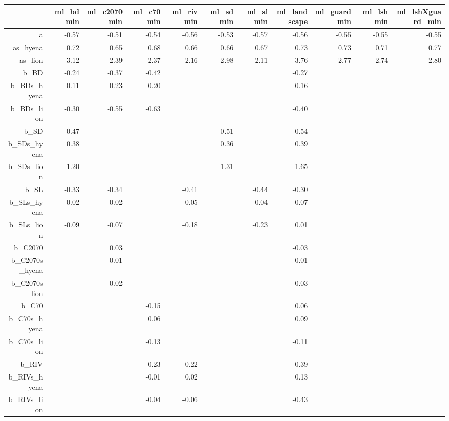 \begin{table}[ht]
\centering
\begin{tabular}{rrrrrrrrrrr}
  \hline
 & ml\_bd\_min & ml\_c2070\_min & ml\_c70\_min & ml\_riv\_min & ml\_sd\_min & ml\_sl\_min & ml\_landscape & ml\_guard\_min & ml\_lsh\_min & ml\_lshXguard\_min \\ 
  \hline
a & -0.57 & -0.51 & -0.54 & -0.56 & -0.53 & -0.57 & -0.56 & -0.55 & -0.55 & -0.55 \\ 
  as\_hyena & 0.72 & 0.65 & 0.68 & 0.66 & 0.66 & 0.67 & 0.73 & 0.73 & 0.71 & 0.77 \\ 
  as\_lion & -3.12 & -2.39 & -2.37 & -2.16 & -2.98 & -2.11 & -3.76 & -2.77 & -2.74 & -2.80 \\ 
  b\_BD & -0.24 & -0.37 & -0.42 &  &  &  & -0.27 &  &  &  \\ 
  b\_BDs\_hyena & 0.11 & 0.23 & 0.20 &  &  &  & 0.16 &  &  &  \\ 
  b\_BDs\_lion & -0.30 & -0.55 & -0.63 &  &  &  & -0.40 &  &  &  \\ 
  b\_SD & -0.47 &  &  &  & -0.51 &  & -0.54 &  &  &  \\ 
  b\_SDs\_hyena & 0.38 &  &  &  & 0.36 &  & 0.39 &  &  &  \\ 
  b\_SDs\_lion & -1.20 &  &  &  & -1.31 &  & -1.65 &  &  &  \\ 
  b\_SL & -0.33 & -0.34 &  & -0.41 &  & -0.44 & -0.30 &  &  &  \\ 
  b\_SLs\_hyena & -0.02 & -0.02 &  & 0.05 &  & 0.04 & -0.07 &  &  &  \\ 
  b\_SLs\_lion & -0.09 & -0.07 &  & -0.18 &  & -0.23 & 0.01 &  &  &  \\ 
  b\_C2070 &  & 0.03 &  &  &  &  & -0.03 &  &  &  \\ 
  b\_C2070s\_hyena &  & -0.01 &  &  &  &  & 0.01 &  &  &  \\ 
  b\_C2070s\_lion &  & 0.02 &  &  &  &  & -0.03 &  &  &  \\ 
  b\_C70 &  &  & -0.15 &  &  &  & 0.06 &  &  &  \\ 
  b\_C70s\_hyena &  &  & 0.06 &  &  &  & 0.09 &  &  &  \\ 
  b\_C70s\_lion &  &  & -0.13 &  &  &  & -0.11 &  &  &  \\ 
  b\_RIV &  &  & -0.23 & -0.22 &  &  & -0.39 &  &  &  \\ 
  b\_RIVs\_hyena &  &  & -0.01 & 0.02 &  &  & 0.13 &  &  &  \\ 
  b\_RIVs\_lion &  &  & -0.04 & -0.06 &  &  & -0.43 &  &  &  \\ 

\end{tabular}
\end{table}
